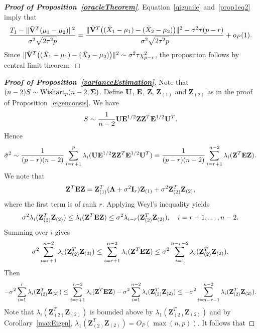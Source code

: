 \documentclass[review]{elsarticle}
\newcommand{\bZ}{\mathbf{Z}}
\theoremstyle{plain}
\theoremstyle{definition}
\theoremstyle{remark}
\begin{document}
\begin{proof}[\textbf{Proof of Proposition~\ref{oracleTheorem}}]
    Equation~\eqref{qiguaile} and~\eqref{prop1eq2} imply that
            $$
            \frac{T_1-\|\tilde{\mathbf{V}}^T(\mu_1-\mu_2)\|^2}{\sigma^2\sqrt{2\tau^2 p}}
            =
            \frac{\|\tilde{\mathbf{V}}^T \big( (\bar{X}_1-\mu_1)-(\bar{X}_2-\mu_2) \big)\|^2-
                \sigma^2 \tau (p-r)}{\sigma^2\sqrt{2\tau^2 p}}
                +o_P(1).
    $$
    Since
$\|\tilde{\mathbf{V}}^T \big( (\bar{X}_1-\mu_1)-(\bar{X}_2-\mu_2) \big)\|^2\sim \sigma^2\tau\chi^2_{p-r}$,
the proposition follows by central limit theorem.
\end{proof}



\begin{proof}[\textbf{Proof of Proposition~\ref{varianceEstimation}}]
    Note that $(n-2)S\sim \mathrm{Wishart}_p (n-2,\boldsymbol{\Sigma})$.
    Define $\mathbf{U}$, $\mathbf{E}$, $\bZ$, $\bZ_{(1)}$ and $\bZ_{(2)}$ as in the proof of Proposition~\ref{eigenconsis}.
    We have
    $$
        S\sim \frac{1}{n-2} \BU \BE^{1/2} \bZ \bZ^T \BE^{1/2} \BU^T.
    $$
    Hence
    \begin{equation*}
        \begin{aligned}
            \hat{\sigma}^2\sim
            \frac{1}{(p-r)(n-2)}\sum_{i=r+1}^p \lambda_i (\BU \BE^{1/2} \bZ \bZ^T \BE^{1/2} \BU^T)
            =
            \frac{1}{(p-r)(n-2)}\sum_{i=r+1}^{n-2} \lambda_i ( \bZ^T \BE \bZ).
        \end{aligned}
    \end{equation*}
    We note that
    $$
    \bZ^T \BE \bZ =\bZ_{(1)}^T (\bLambda +\sigma^2 \BI_r) \bZ_{(1)}+\sigma^2 \bZ_{(2)}^T \bZ_{(2)},
    $$
 where the first term is of rank $r$.
    Applying Weyl's inequality yields
    $$
    \sigma^2\lambda_i(\bZ_{(2)}^T \bZ_{(2)}) \leq \lambda_i(\bZ^T \BE \bZ)\leq
    \sigma^2\lambda_{i-r}(\bZ_{(2)}^T \bZ_{(2)}),
    \quad
    \textrm{$i=r+1,\ldots, n-2$}.
    $$
    Summing over $i$ gives
    $$
    \sigma^2\sum_{i=r+1}^{n-2}\lambda_i(\bZ_{(2)}^T \bZ_{(2)}) \leq \sum_{i=r+1}^{n-2}\lambda_i(\bZ^T \BE \bZ)\leq
    \sigma^2\sum_{i=1}^{n-r-2}\lambda_{i}(\bZ_{(2)}^T \bZ_{(2)}).
    $$
    Then
    $$
    -\sigma^2\sum_{i=1}^{r}\lambda_i(\bZ_{(2)}^T \bZ_{(2)}) \leq \sum_{i=r+1}^{n-2}\lambda_i(\bZ^T \BE \bZ)
    -\sigma^2\sum_{i=1}^{n-2}\lambda_{i}(\bZ_{(2)}^T \bZ_{(2)})
    \leq
    -\sigma^2\sum_{i=n-r-1}^{n-2}\lambda_{i}(\bZ_{(2)}^T \bZ_{(2)}).
    $$
    Note that $\lambda_i(\bZ_{(2)}^T \bZ_{(2)})$ is bounded above by $\lambda_1(\bZ_{(2)}^T \bZ_{(2)})$ and by Corollary~\ref{maxEigen}, $\lambda_1 (\bZ_{(2)}^T \bZ_{(2)})=O_P(\max(n,p))$. It follows that

\end{proof}
\end{document}
